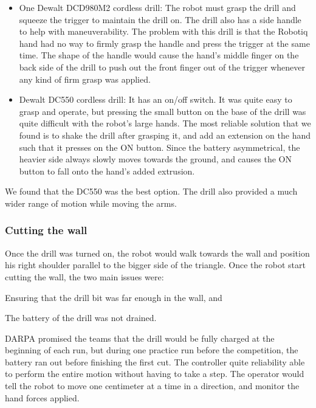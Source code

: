 \documentclass[12pt]{report}
\begin{document}
\begin{itemize}
\item One Dewalt DCD980M2 cordless drill: The robot must grasp the drill and squeeze the trigger to maintain the drill on. The drill also has a side handle to help with maneuverability. The problem with this drill is that the Robotiq hand had no way to firmly grasp the handle and press the trigger at the same time. The shape of the handle would cause the hand's middle finger on the back side of the drill to push out the front finger out of the trigger whenever any kind of firm grasp was applied. 

\item Dewalt DC550 cordless drill: It has an on/off switch. It was quite easy to grasp and operate, but pressing the small button on the base of the drill was quite difficult with the robot's large hands. The most reliable solution that we found is to shake the drill after grasping it, and add an extension on the hand such that it presses on the ON button.  Since the battery asymmetrical, the heavier side always slowly moves towards the ground, and causes the ON button to fall onto the hand's added extrusion. 
\end{itemize}

We found that the DC550 was the best option. The drill also provided a much wider range of motion while moving the arms. 

\subsubsection{Cutting the wall}
Once the drill was turned on, the robot would walk towards the wall and position his right shoulder parallel to the bigger side of the triangle. Once the robot start cutting the wall, the two main issues were:  \begin{inparaenum}
\item Ensuring that the drill bit was far enough in the wall, and  
\item The battery of the drill was not drained. \end{inparaenum} 

DARPA promised the teams that the drill would be fully charged at the beginning of each run, but during one practice run before the competition, the battery ran out before finishing the first cut. The controller quite reliability able to perform the entire motion without having to take a step. The operator would tell the robot to move one centimeter at a time in a direction, and monitor the hand forces applied.  
\end{document}
